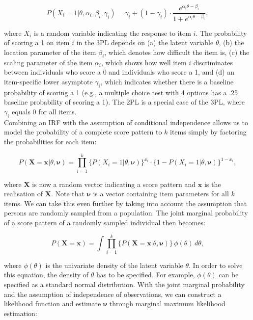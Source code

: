 \documentclass[Royal,sageapa,times,doublespace]{sagej}
\begin{document}
\begin{equation}
P(X_i = 1 | \theta, \alpha_{i}, \beta_{i}, \gamma_{i}) = \gamma_{i} + (1 - \gamma_{i}) \cdot 
\frac{e^{\alpha_{i}\theta - \beta_{i}}}{1 + e^{\alpha_{i}\theta - \beta_{i}}},
\end{equation}

where $X_i$ is a random variable indicating the response to item $i$. The probability of scoring a 1 on item $i$ in the 3PL depends on (a) the latent variable $\theta$, (b) the location parameter of the item $\beta_{i}$, which denotes how difficult the item is, (c) the scaling parameter of the item $\alpha_{i}$, which shows how well item $i$ discriminates between individuals who score a 0 and individuals who score a 1, and (d) an item-specific lower asymptote $\gamma_{i}$, which indicates whether there is a baseline probability of scoring a 1 (e.g., a multiple choice test with 4 options has a .25 baseline probability of scoring a 1). The 2PL is a special case of the 3PL, where $\gamma_{i}$ equals 0 for all items. \\
\indent Combining an IRF with the assumption of conditional independence allows us to model the probability of a complete score pattern to $k$ items simply by factoring the probabilities for each item:

\begin{equation}
P(\boldsymbol{X} = \boldsymbol{x} | \theta, \boldsymbol{\nu}) = \prod_{i=1}^{k} \{P(X_i = 1 | \theta, \boldsymbol{\nu})\}^{x_i} \cdot  \{1 - P(X_i = 1 | \theta, \boldsymbol{\nu}) \}^{1 - x_i},
\end{equation}

where $\boldsymbol{X}$ is now a random vector indicating a score pattern and $\boldsymbol{x}$ is the realisation of $\boldsymbol{X}$. Note that $\boldsymbol{\nu}$ is a vector containing item parameters for all $k$ items. We can take this even further by taking into account the assumption that persons are randomly sampled from a population. The joint marginal probability of a score pattern of a randomly sampled individual then becomes:

\begin{equation}
P(\boldsymbol{X} = \boldsymbol{x}) = \int \prod_{i=1}^{k} \{ P(\boldsymbol{X} = \boldsymbol{x} | \theta, \boldsymbol{\nu}) \} \,\phi(\theta)\,d\theta,
\end{equation}

where $\phi(\theta)$ is the univariate density of the latent variable $\theta$. In order to solve this equation, the density of $\theta$ has to be specified. For example, $\phi(\theta)$ can be specified as a standard normal distribution. With the joint marginal probability and the assumption of independence of observations, we can construct a likelihood function and estimate $\boldsymbol{\nu}$ through marginal maximum likelihood estimation:
\end{document}
